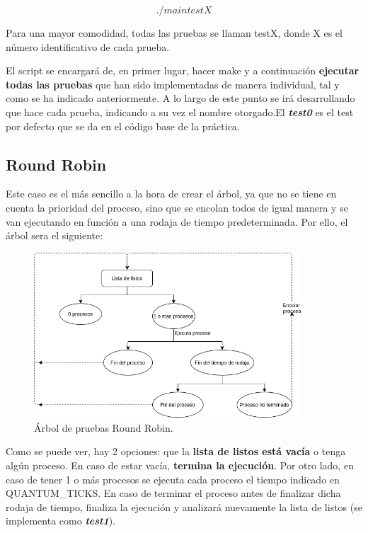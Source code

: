 \documentclass[10pt, spanish, pdftex]{template/UC3M_document}
\begin{document}
                                    $$ ./main testX $$

Para una mayor comodidad, todas las pruebas se llaman testX, donde X es el número identificativo de cada prueba.

El script se encargará de, en primer lugar, hacer make y a continuación \textbf{ejecutar todas las pruebas} que han sido implementadas de manera individual, tal y como se ha indicado anteriormente. A lo largo de este punto se irá desarrollando que hace cada prueba, indicando a su vez el nombre otorgado.El \textbf{\textit{test0}} es el test por defecto que se da en el código base de la práctica.

\subsection{Round Robin}
Este caso es el más sencillo a la hora de crear el árbol, ya que no se tiene en cuenta la prioridad del proceso, sino que se encolan todos de igual manera y se van ejecutando en función a una rodaja de tiempo predeterminada. Por ello, el árbol sera el siguiente:

\vspace{0.5cm}
\begin{figure}[h]
    \centering
    \includegraphics[width=10cm]{arboles/RoundRobin.png}
    \caption{Árbol de pruebas Round Robin.}
\end{figure}

Como se puede ver, hay 2 opciones: que la \textbf{lista de listos está vacía} o tenga algún proceso. En caso de estar vacía, \textbf{termina la ejecución}. Por otro lado, en caso de tener 1 o más procesos se ejecuta cada proceso el tiempo indicado en QUANTUM\_TICKS. En caso de terminar el proceso antes de finalizar dicha rodaja de tiempo, finaliza la ejecución y analizará nuevamente la lista de listos (se implementa como \textbf{\textit{test1}}).  
\end{document}
